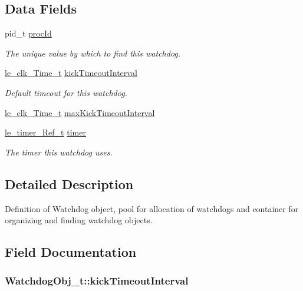 \subsection*{Data Fields}
\begin{DoxyCompactItemize}
\item 
pid\+\_\+t \hyperlink{struct_watchdog_obj__t_a7ca6476d7c613aca8eab52c2d3be863b}{proc\+Id}
\begin{DoxyCompactList}\small\item\em The unique value by which to find this watchdog. \end{DoxyCompactList}\item 
\hyperlink{structle__clk___time__t}{le\+\_\+clk\+\_\+\+Time\+\_\+t} \hyperlink{struct_watchdog_obj__t_a753796cc4032b122ec414896fade8301}{kick\+Timeout\+Interval}
\begin{DoxyCompactList}\small\item\em Default timeout for this watchdog. \end{DoxyCompactList}\item 
\hyperlink{structle__clk___time__t}{le\+\_\+clk\+\_\+\+Time\+\_\+t} \hyperlink{struct_watchdog_obj__t_a29c8899fdeaff1aee8281bfc22765747}{max\+Kick\+Timeout\+Interval}
\item 
\hyperlink{le__timer_8h_a763fa6992488cdce3b5a820817094838}{le\+\_\+timer\+\_\+\+Ref\+\_\+t} \hyperlink{struct_watchdog_obj__t_a2f104dbc15200e7cf8d09c892dcf1f09}{timer}
\begin{DoxyCompactList}\small\item\em The timer this watchdog uses. \end{DoxyCompactList}\end{DoxyCompactItemize}


\subsection{Detailed Description}
Definition of Watchdog object, pool for allocation of watchdogs and container for organizing and finding watchdog objects. 

\subsection{Field Documentation}
\subsubsection[{\texorpdfstring{kick\+Timeout\+Interval}{kickTimeoutInterval}}]{ Watchdog\+Obj\+\_\+t\+::kick\+Timeout\+Interval}\hypertarget{struct_watchdog_obj__t_a753796cc4032b122ec414896fade8301}{}\label{struct_watchdog_obj__t_a753796cc4032b122ec414896fade8301}


